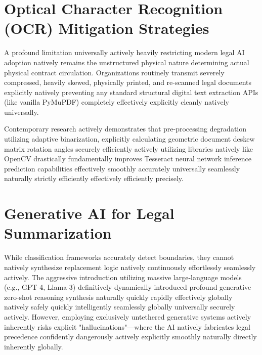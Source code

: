 \documentclass[a4paper,12pt]{report}
\begin{document}
\section{Optical Character Recognition (OCR) Mitigation Strategies}

A profound limitation universally actively heavily restricting modern legal AI adoption natively remains the unstructured physical nature determining actual physical contract circulation. Organizations routinely transmit severely compressed, heavily skewed, physically printed, and re-scanned legal documents explicitly natively preventing any standard structural digital text extraction APIs (like vanilla PyMuPDF) completely effectively explicitly cleanly natively universally.

Contemporary research actively demonstrates that pre-processing degradation utilizing adaptive binarization, explicitly calculating geometric document deskew matrix rotation angles securely efficiently actively utilizing libraries natively like OpenCV drastically fundamentally improves Tesseract neural network inference prediction capabilities effectively smoothly accurately universally seamlessly naturally strictly efficiently effectively efficiently precisely.

\section{Generative AI for Legal Summarization}

While classification frameworks accurately detect boundaries, they cannot natively synthesize replacement logic natively continuously effortlessly seamlessly actively. The aggressive introduction utilizing massive large-language models (e.g., GPT-4, Llama-3) definitively dynamically introduced profound generative zero-shot reasoning synthesis naturally quickly rapidly effectively globally natively safely quickly intelligently seamlessly globally universally securely actively. However, employing exclusively untethered generative systems actively inherently risks explicit "hallucinations"—where the AI natively fabricates legal precedence confidently dangerously actively explicitly smoothly naturally directly inherently globally. 
\end{document}
